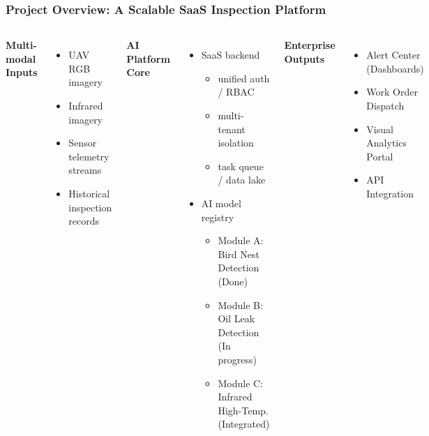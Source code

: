 \documentclass[aspectratio=169]{beamer}
\begin{document}
\begin{frame}
\frametitle{Project Overview: A Scalable SaaS Inspection Platform}
\vspace{-5pt}
\small
\begin{columns}
\textbf{Multi-modal Inputs}
\begin{itemize}
  \item UAV RGB imagery
  \item Infrared imagery
  \item Sensor telemetry streams
  \item Historical inspection records
\end{itemize}

\textbf{AI Platform Core}
\begin{itemize}
  \item SaaS backend
    \begin{itemize}
      \item unified auth / RBAC
      \item multi-tenant isolation
      \item task queue / data lake
    \end{itemize}
  \item AI model registry
    \begin{itemize}
      \item Module A: Bird Nest Detection {\color{green!70!black}(Done)}
      \item Module B: Oil Leak Detection {\color{orange!80!black}(In progress)}
      \item Module C: Infrared High-Temp. {\color{orange!80!black}(Integrated)}
    \end{itemize}
\end{itemize}

\textbf{Enterprise Outputs}
\begin{itemize}
  \item Alert Center (Dashboards)
  \item Work Order Dispatch
  \item Visual Analytics Portal
  \item API Integration
\end{itemize}
\end{columns}
\end{frame}
\end{document}
